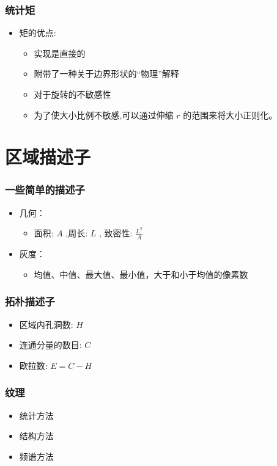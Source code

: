\documentclass{beamer}
\begin{document}
\begin{frame}
\frametitle{统计矩}
\label{sec-3-10}

\begin{itemize}
\item 矩的优点:
\begin{itemize}
\item 实现是直接的
\item 附带了一种关于边界形状的“物理”解释
\item 对于旋转的不敏感性
\item 为了使大小比例不敏感,可以通过伸缩 $r$ 的范围来将大小正则化。
\end{itemize}
\end{itemize}
\end{frame}
\section{区域描述子}
\label{sec-4}
\begin{frame}
\frametitle{一些简单的描述子}
\label{sec-4-1}

\begin{itemize}
\item 几何：
\begin{itemize}
\item 面积: $A$ ,周长: $L$ , 致密性: $\frac{L^2}{A}$
\end{itemize}
\item 灰度：
\begin{itemize}
\item 均值、中值、最大值、最小值，大于和小于均值的像素数
\end{itemize}
\end{itemize}
\end{frame}
\begin{frame}
\frametitle{拓朴描述子}
\label{sec-4-2}

\begin{itemize}
\item 区域内孔洞数: $H$
\item 连通分量的数目: $C$
\item 欧拉数:  $E=C-H$
\end{itemize}
\end{frame}
\begin{frame}
\frametitle{纹理}
\label{sec-4-3}

\begin{itemize}
\item 统计方法
\item 结构方法
\item 频谱方法
\end{itemize}
\end{frame}
\end{document}
